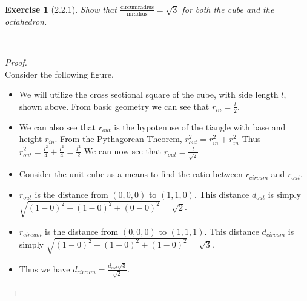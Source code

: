 \documentclass[12pt]{article}
\newcommand{\XB}{\color{black}}
\newcommand{\XBB}{\color{blue}}
\theoremstyle{plain}
\newtheorem{ex}{Exercise}
\begin{document}
\newpage
\XBB\hrulefill\XB \\
\begin{ex} [2.2.1]
  Show that $\displaystyle \frac{\text{circumradius}}{\text{inradius}}=\sqrt{3}$ for both the cube and the octahedron.
\end{ex}
\XBB\hrulefill\XB \\
\begin{proof}
  \ \\
  Consider the following figure. \\
  \begin{center}
  \end{center}
  \begin{itemize}
    \item We will utilize the cross sectional square of the cube, with side length $l$, shown above.
    \subitem From basic geometry we can see that  $\displaystyle r_{in} = \frac{l}{2}$.
    \item We can also see that $r_{out}$ is the hypotenuse of the tiangle with base and height $r_{in}$.
    \subitem From the Pythagorean Theorem, $r_{out}^{2} = r_{in}^{2} + r_{in}^{2} $
    \subitem Thus $\displaystyle r_{out}^{2} = \frac{l^{2}}{4} + \frac{l^{2}}{4} = \frac{l^{2}}{2} $
    \subitem We can now see that $\displaystyle r_{out} = \frac{l}{\sqrt{2}}$
    \item Consider the unit cube as a means to find the ratio between $r_{circum}$ and $r_{out}$.
    \item $r_{out}$ is the distance from $(0,0,0)$ to $(1,1,0)$.
    \subitem This distance $d_{out}$ is simply $\sqrt{(1-0)^2 + (1-0)^2 + (0-0)^2} = \sqrt{2} $.
    \item $r_{circum}$ is the distance from $(0,0,0)$ to $(1,1,1)$.
    \subitem This distance $d_{circum}$ is simply $\sqrt{(1-0)^2 + (1-0)^2 + (1-0)^2} = \sqrt{3} $.
    \item Thus we have $\displaystyle d_{circum} = \frac{d_{out}\sqrt{3}}{\sqrt{2}}$.

\end{itemize}
\end{proof}
\end{document}
